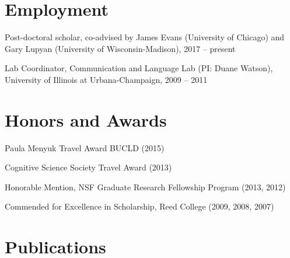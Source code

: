 \documentclass[letterpaper]{article}
\renewenvironment{itemize}{
  \begin{list}{}{
    \setlength{\leftmargin}{1.5em}
  }
}{
  \end{list}
}
\begin{document}
\section*{Employment}

\begin{itemize}
\item Post-doctoral scholar, co-advised by James Evans (University of Chicago) and Gary Lupyan (University of Wisconsin-Madison), 2017 -- present

\item Lab Coordinator, Communication and Language Lab (PI: Duane Watson), University of Illinois at Urbana-Champaign,  2009 -- 2011

\end{itemize}


		

\section*{Honors and Awards}
\begin{itemize}
\item  Paula Menyuk Travel Award BUCLD (2015)
\item Cognitive Science Society Travel Award (2013)
\item Honorable Mention, NSF Graduate Research Fellowship Program (2013, 2012)
\item Commended for Excellence in Scholarship, Reed College (2009, 2008, 2007)
\end{itemize}



\section*{Publications}
\end{document}

